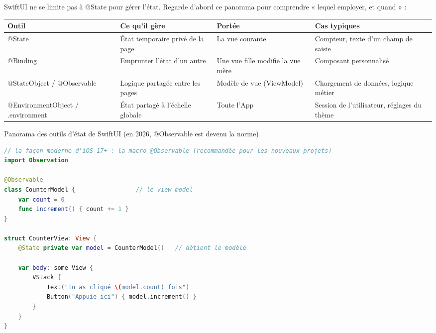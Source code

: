 


SwiftUI ne se limite pas à @State pour gérer l'état. Regarde d'abord ce panorama pour comprendre « lequel employer, et quand » :

\begin{center}
\begin{tabularx}{\linewidth}{|X|X|X|X|}
\hline
\textbf{Outil} & \textbf{Ce qu'il gère} & \textbf{Portée} & \textbf{Cas typiques} \tabularnewline
\hline
@State & État temporaire privé de la page & La vue courante & Compteur, texte d'un champ de saisie \tabularnewline
@Binding & Emprunter l'état d'un autre & Une vue fille modifie la vue mère & Composant personnalisé \tabularnewline
@StateObject / @Observable & Logique partagée entre les pages & Modèle de vue (ViewModel) & Chargement de données, logique métier \tabularnewline
@EnvironmentObject / .environment & État partagé à l'échelle globale & Toute l'App & Session de l'utilisateur, réglages du thème \tabularnewline
\hline
\end{tabularx}
\end{center}

\begin{center}\small\color{gray}Panorama des outils d'état de SwiftUI (en 2026, @Observable est devenu la norme)\end{center}

\begin{lstlisting}[language=Swift]
// la façon moderne d'iOS 17+ : la macro @Observable (recommandée pour les nouveaux projets)
import Observation

@Observable
class CounterModel {                 // le view model
    var count = 0
    func increment() { count += 1 }
}

struct CounterView: View {
    @State private var model = CounterModel()   // détient le modèle

    var body: some View {
        VStack {
            Text("Tu as cliqué \(model.count) fois")
            Button("Appuie ici") { model.increment() }
        }
    }
}
\end{lstlisting}

